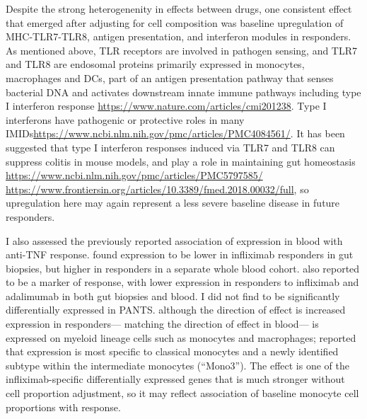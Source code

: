 \begin{outline}
Despite the strong heterogenenity in effects between drugs, one consistent effect that emerged after adjusting for cell composition was 
baseline upregulation of MHC-TLR7-TLR8, antigen presentation, and interferon modules in responders.
As mentioned above, \gls{TLR} receptors are involved in pathogen sensing, and TLR7 and TLR8 are endosomal proteins primarily expressed in monocytes, macrophages and \glspl{DC},
part of an antigen presentation pathway that senses bacterial DNA and activates downstream innate immune pathways including type I interferon response \url{https://www.nature.com/articles/cmi201238}.
Type I interferons have pathogenic or protective roles in many \glspl{IMID}\url{https://www.ncbi.nlm.nih.gov/pmc/articles/PMC4084561/}.
It has been suggested that type I interferon responses induced via TLR7 and TLR8 can suppress colitis in mouse models, and play a role in maintaining gut homeostasis
\url{https://www.ncbi.nlm.nih.gov/pmc/articles/PMC5797585/}
\url{https://www.frontiersin.org/articles/10.3389/fmed.2018.00032/full},
so upregulation here may again represent a less severe baseline disease in future responders.

I also assessed the previously reported association of  expression in blood with anti-\gls{TNF} response.
\textcite{gaujoux2019CellcentredMetaanalysisReveals} found  expression to be 
lower in infliximab responders in gut biopsies,
but higher in responders in a separate whole blood cohort.
\textcite{verstockt2019LowTREM1Expression} also reported  to be a marker of response,
with lower expression in responders to infliximab and adalimumab in both gut biopsies and blood.
I did not find  to be significantly differentially expressed in \gls{PANTS}.
although the direction of effect is increased expression in responders---
matching the \textcite{gaujoux2019CellcentredMetaanalysisReveals} direction of effect in blood---
 is expressed on myeloid lineage cells such as monocytes and macrophages;
\textcite{villani2017SinglecellRNAseqReveals} reported that  expression is most specific to 
classical monocytes and a newly identified subtype within the intermediate monocytes (\enquote{Mono3}).
The  effect is one of the infliximab-specific differentially expressed genes that is much stronger without cell proportion adjustment,
so it may reflect association of baseline monocyte cell proportions with response.


\end{outline}
